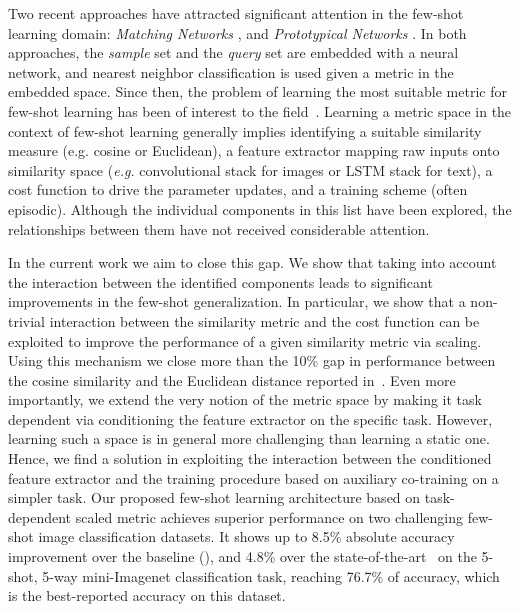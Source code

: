 \documentclass{article}
\begin{document}
Two recent approaches have attracted significant attention in the few-shot learning domain: \emph{Matching Networks} \citep{vinyals2016matching}, and \emph{Prototypical Networks} \citep{snell2017prototypical}. In both approaches, the \emph{sample} set and the \emph{query} set are embedded with a neural network, and nearest neighbor classification is used given a metric in the embedded space. Since then, the problem of learning the most suitable metric for few-shot learning has been of interest to the field~\citep{vinyals2016matching, snell2017prototypical,sung2018learning,munkhdalai2018rapid,mishra2018simle}. Learning a metric space in the context of few-shot learning generally implies identifying a suitable similarity measure (e.g. cosine or Euclidean), a feature extractor mapping raw inputs onto similarity space (\emph{e.g.} convolutional stack for images or LSTM stack for text), a cost function to drive the parameter updates, and a training scheme (often episodic). Although the individual components in this list have been explored, the relationships between them have not received considerable attention.   

In the current work we aim to close this gap. We show that taking into account the interaction between the identified components leads to significant improvements in the few-shot generalization. In particular, we show that a non-trivial interaction between the similarity metric and the cost function can be exploited to improve the performance of a given similarity metric via scaling. Using this mechanism we close more than the 10\% gap in performance between the cosine similarity and the Euclidean distance reported in~\citep{snell2017prototypical}. Even more importantly, we extend the very notion of the metric space by making it task dependent via conditioning the feature extractor on the specific task. However, learning such a space is in general more challenging than learning a static one. Hence, we find a solution in exploiting the interaction between the conditioned feature extractor and the training procedure based on auxiliary co-training on a simpler task. Our proposed few-shot learning architecture based on task-dependent scaled metric achieves superior performance on two challenging few-shot image classification datasets. It shows up to 8.5\% absolute accuracy improvement over the baseline (\citet{snell2017prototypical}), and 4.8\% over the state-of-the-art~\citep{munkhdalai2018rapid} on the 5-shot, 5-way mini-Imagenet classification task, reaching 76.7\% of accuracy, which is the best-reported accuracy on this dataset.
\end{document}
